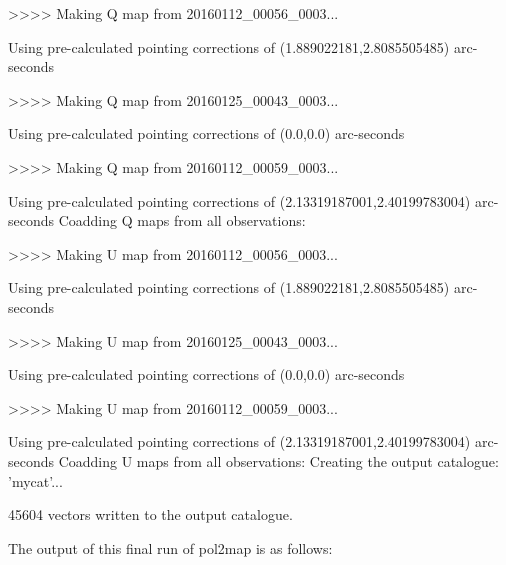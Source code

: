 \begin{terminalv}
>>>>   Making Q map from 20160112_00056_0003...

   Using pre-calculated pointing corrections of (1.889022181,2.8085505485) arc-seconds

>>>>   Making Q map from 20160125_00043_0003...

   Using pre-calculated pointing corrections of (0.0,0.0) arc-seconds

>>>>   Making Q map from 20160112_00059_0003...

   Using pre-calculated pointing corrections of (2.13319187001,2.40199783004) arc-seconds
Coadding Q maps from all observations:

>>>>   Making U map from 20160112_00056_0003...

   Using pre-calculated pointing corrections of (1.889022181,2.8085505485) arc-seconds

>>>>   Making U map from 20160125_00043_0003...

   Using pre-calculated pointing corrections of (0.0,0.0) arc-seconds

>>>>   Making U map from 20160112_00059_0003...

   Using pre-calculated pointing corrections of (2.13319187001,2.40199783004) arc-seconds
Coadding U maps from all observations:
Creating the output catalogue: 'mycat'...

45604 vectors written to the output catalogue.
\end{terminalv}


The output of this final run of pol2map is as follows:

